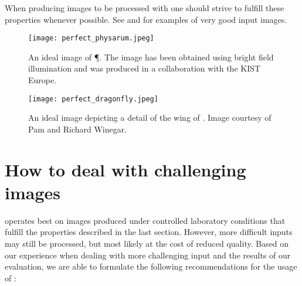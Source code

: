 	When producing images to be processed with \NEFI one should strive to fulfill these properties whenever possible. See  and  for examples of very good input images.

	\begin{figure}
		\centering
		\texttt{[image: perfect\_physarum.jpeg]}
		\caption[\NEFIs caveats: An ideal iamge of \P.]{An ideal image of \P. The image has been obtained using bright field illumination and was produced in a collaboration with the KIST Europe.}
		\label{fig:sup:good1}
	\end{figure}

	\begin{figure}
		\centering
		\texttt{[image: perfect\_dragonfly.jpeg]}
		\caption[\NEFIs caveats: An ideal iamge of \A.]{An ideal image depicting a detail of the wing of \A. Image courtesy of Pam and Richard Winegar.}
		\label{fig:sup:good2}
	\end{figure}

\section{How to deal with challenging images}

	\NEFI operates best on images produced under controlled laboratory conditions that fulfill the properties described in the last section. However, more difficult inputs may still be processed, but most likely at the cost of reduced quality. Based on our experience when dealing with more challenging input and the results of our evaluation, we are able to formulate the following recommendations for the usage of \NEFI:

